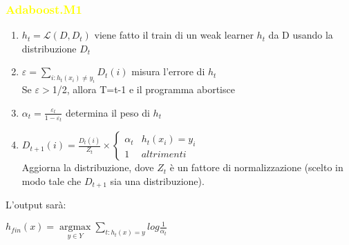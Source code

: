 \documentclass[handout
]{beamer}
\def\yellow#1{{\textcolor{yellow}{#1}}}
\begin{document}
\begin{frame}
\frametitle{\yellow{Adaboost.M1}}


\begin{enumerate}

\item  \begin{math} h_t=\mathcal{L}(D,D_t)\end{math} viene fatto il train di un weak learner
    \begin{math} h_t\end{math} da D usando la distribuzione \begin{math} D_t\end{math}
\item   \begin{math}\varepsilon = \sum_{i:h_t(x_i)\ne y_i}D_t(i)\end{math} misura l'errore di \begin{math} h_t\end{math}\\
Se \begin{math}\varepsilon>\end{math}1/2, allora T=t-1 e il programma abortisce
                          
\item \begin{math} \alpha_t=\frac{\varepsilon_t}{1-\varepsilon_t}  \end{math} determina il peso di \begin{math} h_t\end{math}

\item \begin{math} D_{t+1}(i)=\frac{D_t(i)}{Z_t}\times \begin{cases} \alpha_t &   h_t(x_i)=y_i \\ 1 & altrimenti \end{cases}\end{math} \\
Aggiorna la distribuzione, dove \begin{math}Z_t \end{math} \`e un fattore di normalizzazione (scelto in 
modo tale che \begin{math}D_{t+1} \end{math}
sia una distribuzione).
\end{enumerate}
L'output sar\`a:
\begin{center}
\begin{math} h_{fin}(x)= \underset{y\in Y}{\operatorname{argmax}}\sum_{t:h_t(x)=y} log\frac{1}{\alpha_t} \end{math}
\end{center}





\end{frame}
\end{document}
